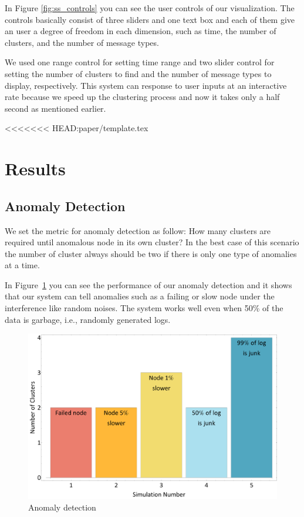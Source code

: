 \documentclass[conference]{style/acmsiggraph}
\begin{document}
In Figure \ref{fig:ss_controls} you can see the user controls of our visualization. The controls
basically consist of three sliders and one text box and each of them give an user a degree of
freedom in each dimension, such as time, the number of clusters, and the number of message types.

We used one range control for setting time range and two slider control for setting the number of
clusters to find and the number of message types to display, respectively. This system can response
to user inputs at an interactive rate because we speed up the clustering process and now it takes
only a half second as mentioned earlier.

<<<<<<< HEAD:paper/template.tex

\section{Results}

\subsection{Anomaly Detection}
We set the metric for anomaly detection as follow: How many clusters are required until anomalous
node in its own cluster? In the best case of this scenario the number of cluster always should be
two if there is only one type of anomalies at a time.

In Figure~\ref{fig:anomaly} you can see the performance of our anomaly detection and it shows that
our system can tell anomalies such as a failing or slow node under the interference like random
noises. The system works well even when 50\% of the data is garbage, i.e., randomly generated logs.

\begin{figure}[p]
    \centering
    \includegraphics[width=1.0\columnwidth]{images/anomaly.pdf}
    \caption{Anomaly detection}
    \label{fig:anomaly}
\end{figure}
\end{document}
